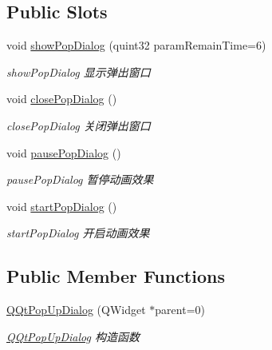 \subsection*{Public Slots}
\begin{DoxyCompactItemize}
\item 
void \mbox{\hyperlink{class_q_qt_pop_up_dialog_a7745a81f4d839207cdcf9175ce960be1}{show\+Pop\+Dialog}} (quint32 param\+Remain\+Time=6)
\begin{DoxyCompactList}\small\item\em show\+Pop\+Dialog 显示弹出窗口 \end{DoxyCompactList}\item 
\mbox{\label{class_q_qt_pop_up_dialog_aee4e7e80ebaed8a0ff1a4751cb174e3d}} 
void \mbox{\hyperlink{class_q_qt_pop_up_dialog_aee4e7e80ebaed8a0ff1a4751cb174e3d}{close\+Pop\+Dialog}} ()
\begin{DoxyCompactList}\small\item\em close\+Pop\+Dialog 关闭弹出窗口 \end{DoxyCompactList}\item 
\mbox{\label{class_q_qt_pop_up_dialog_a94eaec29e362eecb46565665323fd8d6}} 
void \mbox{\hyperlink{class_q_qt_pop_up_dialog_a94eaec29e362eecb46565665323fd8d6}{pause\+Pop\+Dialog}} ()
\begin{DoxyCompactList}\small\item\em pause\+Pop\+Dialog 暂停动画效果 \end{DoxyCompactList}\item 
\mbox{\label{class_q_qt_pop_up_dialog_ac53723580e7faada21a89020b67fb50e}} 
void \mbox{\hyperlink{class_q_qt_pop_up_dialog_ac53723580e7faada21a89020b67fb50e}{start\+Pop\+Dialog}} ()
\begin{DoxyCompactList}\small\item\em start\+Pop\+Dialog 开启动画效果 \end{DoxyCompactList}\end{DoxyCompactItemize}
\subsection*{Public Member Functions}
\begin{DoxyCompactItemize}
\item 
\mbox{\hyperlink{class_q_qt_pop_up_dialog_a226cbee607124af399aaed2dabd35862}{Q\+Qt\+Pop\+Up\+Dialog}} (Q\+Widget $\ast$parent=0)
\begin{DoxyCompactList}\small\item\em \mbox{\hyperlink{class_q_qt_pop_up_dialog}{Q\+Qt\+Pop\+Up\+Dialog}} 构造函数 \end{DoxyCompactList}\end{DoxyCompactItemize}


